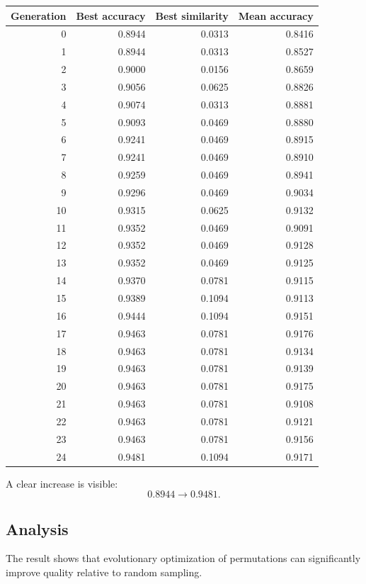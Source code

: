 \documentclass[11pt,a4paper]{report}
\begin{document}
\begin{center}
\begin{tabular}{rrrr}
\toprule
Generation & Best accuracy & Best similarity & Mean accuracy \\
\midrule
0 & 0.8944 & 0.0313 & 0.8416 \\
1 & 0.8944 & 0.0313 & 0.8527 \\
2 & 0.9000 & 0.0156 & 0.8659 \\
3 & 0.9056 & 0.0625 & 0.8826 \\
4 & 0.9074 & 0.0313 & 0.8881 \\
5 & 0.9093 & 0.0469 & 0.8880 \\
6 & 0.9241 & 0.0469 & 0.8915 \\
7 & 0.9241 & 0.0469 & 0.8910 \\
8 & 0.9259 & 0.0469 & 0.8941 \\
9 & 0.9296 & 0.0469 & 0.9034 \\
10 & 0.9315 & 0.0625 & 0.9132 \\
11 & 0.9352 & 0.0469 & 0.9091 \\
12 & 0.9352 & 0.0469 & 0.9128 \\
13 & 0.9352 & 0.0469 & 0.9125 \\
14 & 0.9370 & 0.0781 & 0.9115 \\
15 & 0.9389 & 0.1094 & 0.9113 \\
16 & 0.9444 & 0.1094 & 0.9151 \\
17 & 0.9463 & 0.0781 & 0.9176 \\
18 & 0.9463 & 0.0781 & 0.9134 \\
19 & 0.9463 & 0.0781 & 0.9139 \\
20 & 0.9463 & 0.0781 & 0.9175 \\
21 & 0.9463 & 0.0781 & 0.9108 \\
22 & 0.9463 & 0.0781 & 0.9121 \\
23 & 0.9463 & 0.0781 & 0.9156 \\
24 & 0.9481 & 0.1094 & 0.9171 \\
\bottomrule
\end{tabular}
\end{center}

A clear increase is visible:
\[
0.8944\to 0.9481.
\]

\subsection{Analysis}

The result shows that evolutionary optimization of permutations can significantly improve quality relative to random sampling.
\end{document}
